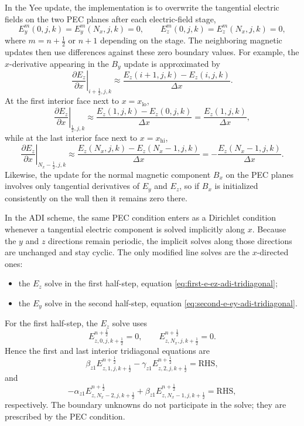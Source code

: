 \documentclass{article}
\numberwithin{equation}{section}
\numberwithin{figure}{section}
\begin{document}
In the Yee update, the implementation is to overwrite the tangential electric fields on the two PEC planes after each electric-field stage,
\begin{equation}
    E_y^m(0,j,k) = E_y^m(N_x,j,k) = 0, \qquad E_z^m(0,j,k) = E_z^m(N_x,j,k) = 0,
\end{equation}
where $m=n+\frac12$ or $n+1$ depending on the stage. The neighboring magnetic updates then use differences against these zero boundary values. For example, the $x$-derivative appearing in the $B_y$ update is approximated by
\begin{equation}
    \left.\frac{\partial E_z}{\partial x}\right|_{i+\frac12,j,k} \approx \frac{E_z(i+1,j,k)-E_z(i,j,k)}{\Delta x}.
\end{equation}
At the first interior face next to $x=x_{\mathrm{lo}}$,
\begin{equation}
    \left.\frac{\partial E_z}{\partial x}\right|_{\frac12,j,k} \approx \frac{E_z(1,j,k)-E_z(0,j,k)}{\Delta x} = \frac{E_z(1,j,k)}{\Delta x},
\end{equation}
while at the last interior face next to $x=x_{\mathrm{hi}}$,
\begin{equation}
    \left.\frac{\partial E_z}{\partial x}\right|_{N_x-\frac12,j,k} \approx \frac{E_z(N_x,j,k)-E_z(N_x-1,j,k)}{\Delta x} = -\frac{E_z(N_x-1,j,k)}{\Delta x}.
\end{equation}
Likewise, the update for the normal magnetic component $B_x$ on the PEC planes involves only tangential derivatives of $E_y$ and $E_z$, so if $B_x$ is initialized consistently on the wall then it remains zero there.

In the ADI scheme, the same PEC condition enters as a Dirichlet condition whenever a tangential electric component is solved implicitly along $x$. Because the $y$ and $z$ directions remain periodic, the implicit solves along those directions are unchanged and stay cyclic. The only modified line solves are the $x$-directed ones:
\begin{itemize}
    \item the $E_z$ solve in the first half-step, equation \eqref{eq:first-e-ez-adi-tridiagonal};
    \item the $E_y$ solve in the second half-step, equation \eqref{eq:second-e-ey-adi-tridiagonal}.
\end{itemize}

For the first half-step, the $E_z$ solve uses
\begin{equation}
    E_{z,0,j,k+\tfrac12}^{n+\frac12} = 0, \qquad E_{z,N_x,j,k+\tfrac12}^{n+\frac12} = 0.
\end{equation}
Hence the first and last interior tridiagonal equations are
\begin{equation}
    \beta_{z1} E_{z,1,j,k+\tfrac12}^{n+\frac12} - \gamma_{z1} E_{z,2,j,k+\tfrac12}^{n+\frac12} = \mathrm{RHS},
\end{equation}
and
\begin{equation}
    -\alpha_{z1} E_{z,N_x-2,j,k+\tfrac12}^{n+\frac12} + \beta_{z1} E_{z,N_x-1,j,k+\tfrac12}^{n+\frac12} = \mathrm{RHS},
\end{equation}
respectively. The boundary unknowns do not participate in the solve; they are prescribed by the PEC condition.
\end{document}
